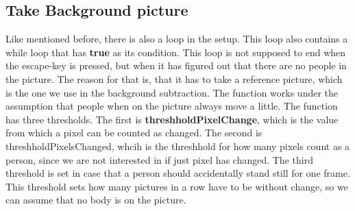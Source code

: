 \subsection{Take Background picture}
Like mentioned before, there is also a loop in the setup. This loop also contains a while loop that has \textbf{true} as its condition. This loop is not supposed to end when the escape-key is pressed, but when it has figured out that there are no people in the picture. The reason for that is, that it has to take a reference picture, which is the one we use in the background subtraction. The function works under the assumption that people when on the picture always move a little. The function has three thresholds. The first is \textbf{threshholdPixelChange}, which is the value from which a pixel can be counted as changed. The second is threshholdPixelsChanged, whcih is the threshhold for how many pixels count as a person, since we are not interested in if just pixel has changed. The third threshold is set in case that a person should accidentally stand still for one frame. This threshold sets how many pictures in a row have to be without change, so we can assume that no body is on the picture. 
